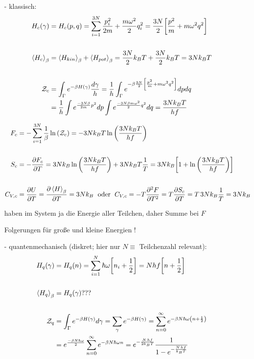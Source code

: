\documentclass[../KlassMech_main.tex]{subfiles}
\begin{document}
\begin{itemize}
\item[-] klassisch:
\begin{align*}\label{key}
H_c(\gamma) &= H_c(p,q) = \sum\limits_{i=1}^{3N} \frac{p_i^2}{2m} + \frac{m\omega^2}{2}q_i^2 = \frac{3N}{2} \qty[\frac{p^2}{m} + m\omega^2q^2]%
\\\\
\expval{H_c}_\beta &= \expval{H_{kin}}_\beta + \expval{H_{pot}}_\beta = \frac{3N}{2} k_B T + \frac{3N}{2} k_B T = 3 N k_B T
\\\\
\mathcal{Z}_c &= \int_\Gamma e^{-\beta H(\gamma)} \frac{d\gamma}{h} = \frac{1}{h} \int_\Gamma e^{-\beta \frac{3N}{2} \qty[\frac{p^2}{m} + m\omega^2 q^2]} dp dq
\\
&= \frac{1}{h} \int e^{\frac{-3N\beta}{2m} p^2} dp \int e^{\frac{-3N\beta m\omega^2}{2} q^2} dq = \frac{3 N k_B T}{h f}
\end{align*}

\begin{align*}
F_c &= -\sum\limits_{i=1}^{3N} \frac{1}{\beta} \ln\qty(\mathcal{Z}_c) = - 3N k_B T \ln\qty(\frac{3 N k_B T}{h f})
\\\\
S_c &= -\pdv{F_c}{T} = 3N k_B \ln\qty(\frac{3 N k_B T}{h f}) + 3N k_B T \frac{1}{T} = 3N k_B \qty[1 + \ln\qty(\frac{3 N k_B T}{h f})]
\\\\
C_{V, c} &= \pdv{U}{T} = \pdv{\expval{H}_\beta}{T} = 3 N k_B \; \text{ oder } \; C_{V, c} = -T \pdv[2]{F}{T} = T \pdv{S_c}{T} = T \,3N  k_B \frac{1}{T} = 3N k_B
\end{align*}

haben im System ja die Energie aller Teilchen, daher Summe bei $F$

Folgerungen für große und kleine Energien !


\item[-] quantenmechanisch (diskret; hier nur $N \equiv$ Teilchenzahl relevant):
\begin{align*}
H_q(\gamma) &= H_q(n) = \sum\limits_{i=1}^N \hbar\omega \qty[n_i+\frac{1}{2}] = N h f \qty[n+\frac{1}{2}]
\\\\
\expval{H_q}_\beta &= H_q(\gamma) ???
\\\\
\mathcal{Z}_q &= \int_\Gamma e^{-\beta H(\gamma)} d\gamma = \sum\limits_\gamma e^{-\beta H(\gamma)} = \sum\limits_{n=0}^\infty e^{-\beta N\hbar\omega \qty(n+\frac{1}{2})}
\\
&= e^{\frac{-\beta N\hbar\omega}{2}} \sum\limits_{n=0}^\infty e^{-\beta N\hbar\omega n} = e^{-\frac{N \, h f}{2 k_B T}} \frac{1}{1-e^{-\frac{N \, h f}{k_B T}}}
\end{align*}


\end{itemize}
\end{document}
